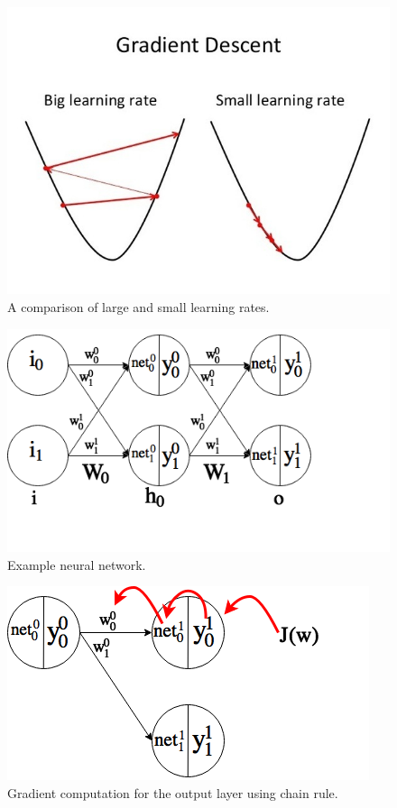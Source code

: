 \documentclass{article}
\begin{document}
\begin{figure}[h!]
\centering
\includegraphics[scale=0.6]{figs/lr.jpeg}
\caption{A comparison of large and small learning rates. \cite{lr}}
\label{fig:lr}
\end{figure}

\begin{figure}[h!]
\centering
\hspace{3cm} 
\includegraphics[scale=0.7]{figs/bp_ex.png}
\caption{Example neural network.}
\label{fig:bp_ex}
\end{figure}

\begin{figure}[h!]
\centering
\hspace{0.5cm} 
\includegraphics[scale=0.7]{figs/weight_update.png}
\caption{Gradient computation for the output layer using chain rule.}
\label{fig:wu}
\end{figure}
\end{document}

